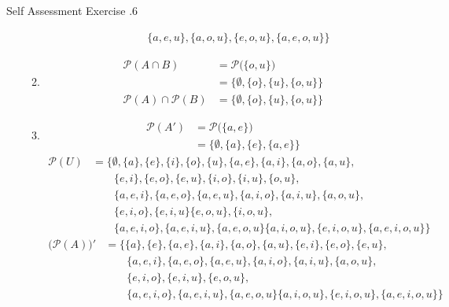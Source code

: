 \documentclass[../notes.tex]{subfiles}
\begin{document}
\begin{exercisebox}{Self Assessment Exercise \thechapter.6}
\begin{enumerate}
\begin{enumerate}[label=(\alph*)]
\begin{align*}
                  & \qquad \{a, e, u\}, \{a, o, u\}, \{e, o, u\}, \{a, e, o, u\}\bigr\}
                \end{align*}
              \item \rule{0pt}{11pt} \vspace*{-25pt}
                \begin{align*}
                  \mathcal{P}(A \cap B) &= \mathcal{P}\bigl(\{o, u\}\bigr)\\
                  &= \bigl\{\emptyset, \{o\}, \{u\}, \{o, u\}\bigr\}\\
                  \mathcal{P}(A) \cap \mathcal{P}(B) &= \bigl\{\emptyset, \{o\}, \{u\}, \{o, u\}\bigr\}
                \end{align*}
              \item \rule{0pt}{11pt} \vspace*{-25pt}
                \begin{align*}
                  \mathcal{P}\left(A'\right) &= \mathcal{P}\bigl(\{a, e\}\bigr)\\
                  &= \bigl\{\emptyset, \{a\}, \{e\}, \{a, e\}\bigr\}
                \end{align*}
                \begin{align*}
                  \mathcal{P}(U) &= \bigl\{\emptyset, \{a\}, \{e\}, \{i\}, \{o\}, \{u\}, \{a, e\}, \{a, i\}, \{a, o\}, \{a, u\},\\
                  & \qquad \{e, i\}, \{e, o\}, \{e, u\}, \{i, o\}, \{i, u\}, \{o, u\},\\
                  & \qquad \{a, e, i\}, \{a, e, o\}, \{a, e, u\}, \{a, i, o\}, \{a, i, u\}, \{a, o, u\},\\
                  & \qquad \{e, i, o\}, \{e, i, u\} \{e, o, u\}, \{i, o, u\},\\
                  & \qquad \{a, e, i, o\}, \{a, e, i, u\}, \{a, e, o, u\} \{a, i, o, u\}, \{e, i, o, u\}, \{a, e, i, o, u\}\bigr\}
                \end{align*}
                \begin{align*}
                  \bigl(\mathcal{P}(A)\bigr)' &= \bigl\{\{a\}, \{e\}, \{a, e\}, \{a, i\}, \{a, o\}, \{a, u\}, \{e, i\}, \{e, o\}, \{e, u\},\\
                  & \qquad \{a, e, i\}, \{a, e, o\}, \{a, e, u\}, \{a, i, o\}, \{a, i, u\}, \{a, o, u\}, \\
                  & \qquad \{e, i, o\}, \{e, i, u\},  \{e, o, u\}, \\
                  & \qquad \{a, e, i, o\}, \{a, e, i, u\}, \{a, e, o, u\} \{a, i, o, u\}, \{e, i, o, u\}, \{a, e, i, o, u\}\bigr\}

\end{align*}
\end{enumerate}
\end{enumerate}
\end{exercisebox}
\end{document}
